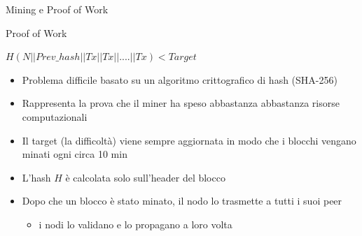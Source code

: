 \documentclass{beamer}
\begin{document}
  \begin{frame}{Mining e Proof of Work}
      \begin{block}{Proof of Work}
      \begin{center}
          $H(N||Prev\_hash||Tx||Tx||....||Tx)<Target$
      \end{center}
        \begin{itemize}
            \item Problema difficile basato su un algoritmo crittografico di hash (SHA-256)
            \item Rappresenta la prova che il miner ha speso abbastanza abbastanza risorse computazionali
            \item Il target (la difficoltà) viene sempre aggiornata in modo che i blocchi vengano minati ogni circa 10 min
            \item L'hash $H$ è calcolata solo sull'header del blocco
            \item Dopo che un blocco è stato minato, il nodo lo trasmette a tutti i suoi peer
            \begin{itemize}
                \item[\MVRightarrow] i nodi lo validano e lo propagano a loro volta
            \end{itemize}
        \end{itemize}
      \end{block}
  \end{frame}
  
  
  
\end{document}
